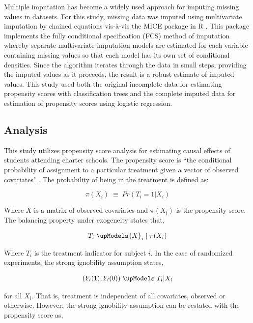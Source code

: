 \documentclass[letterpaper,12p,twoside]{article} %
\begin{document}
Multiple imputation \cite{rubin1987,Rubin1996mi} has become a widely used approach for imputing missing values in datasets. For this study, missing data was imputed using multivariate imputation by chained equations vis-\`{a}-vis the MICE package \cite{mice,vanbuuren} in R \cite{rdevelopment}. This package implements the fully conditional specification (FCS) method of imputation whereby separate multivariate imputation models are estimated for each variable containing missing values so that each model has its own set of conditional densities. Since the algorithm iterates through the data in small steps, providing the imputed values as it proceeds, the result is a robust estimate of imputed values. This study used both the original incomplete data for estimating propensity scores with classification trees and the complete imputed data for estimation of propensity scores using logistic regression.

\subsection{Analysis}

This study utilizes propensity score analysis for estimating causal effects of students attending charter schools. The propensity score is ``the conditional probability of assignment to a particular treatment given a vector of observed covariates" \cite{RosenbaumRubin1983}. The probability of being in the treatment is defined as:

\begin{equation}
\pi ({ X }_{ i }) \; \equiv \; Pr({ T }_{ i } = 1 | { X }_{ i })
\end{equation}

\noindent Where $X$ is a matrix of observed covariates and $\pi ({ X }_{ i })$ is the propensity score. The balancing property under exogeneity states that,

\begin{equation}
{ T }_{ i } \; \upModels { X }_{ i } \;| \; \pi ({ X }_{ i })
\end{equation}

\noindent Where $T_i$ is the treatment indicator for subject $i$. In the case of randomized experiments, the strong ignobility assumption states,

\begin{equation}
({ Y }_{ i }(1),{ Y }_{ i }(0)) \; \upModels \; { T }_{ i }|{ X }_{ i }
\end{equation}

\noindent for all ${X}_{i}$. That is, treatment is independent of all covariates, observed or otherwise. However, the strong ignobility assumption can be restated with the propensity score as,
\end{document}
